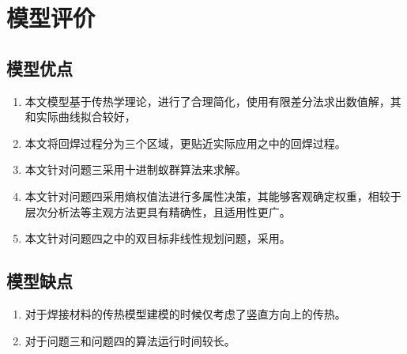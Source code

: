 \section{模型评价}
\subsection{模型优点}
\begin{enumerate}
\item 本文模型基于传热学理论，进行了合理简化，使用有限差分法求出数值解，其和实际曲线拟合较好，
\item 本文将回焊过程分为三个区域，更贴近实际应用之中的回焊过程。
\item 本文针对问题三采用十进制蚁群算法来求解。
\item 本文针对问题四采用熵权值法进行多属性决策，其能够客观确定权重，相较于层次分析法等主观方法更具有精确性，且适用性更广。
\item 本文针对问题四之中的双目标非线性规划问题，采用。
\end{enumerate}

\subsection{模型缺点}
\begin{enumerate}
\item 对于焊接材料的传热模型建模的时候仅考虑了竖直方向上的传热。
\item 对于问题三和问题四的算法运行时间较长。
\end{enumerate}
